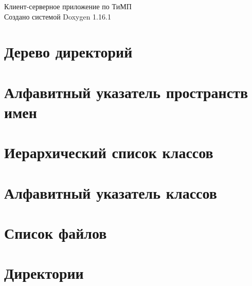 \documentclass[twoside]{book}
\newcommand{\+}{\discretionary{\mbox{\scriptsize$\hookleftarrow$}}{}{}}
\newcommand{\clearemptydoublepage}{%
    \newpage{\pagestyle{empty}\cleardoublepage}%
  }
\begin{document}
  \raggedbottom
    \hypersetup{pageanchor=false,
                bookmarksnumbered=true,
                pdfencoding=unicode
               }
  \begin{titlepage}
  \vspace*{7cm}
  \begin{center}%
  {\Large Клиент-\/серверное приложение по ТиМП}\\
  \vspace*{1cm}
  {\large Создано системой Doxygen 1.16.1}\\
  \end{center}
  \end{titlepage}
  \clearemptydoublepage
  \tableofcontents
  \clearemptydoublepage
  \hypersetup{pageanchor=true}
\chapter{Дерево директорий}

\chapter{Алфавитный указатель пространств имен}

\chapter{Иерархический список классов}

\chapter{Алфавитный указатель классов}

\chapter{Список файлов}

\chapter{Директории}



















\end{document}
